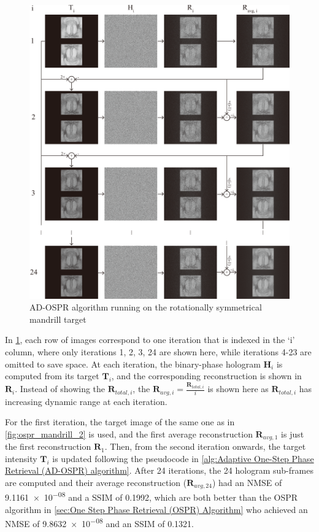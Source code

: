 \begin{figure}[H]
	\centering
	\includegraphics[width=1.0\textwidth]{adospr_mandrill_2.pdf}
	\caption{AD-OSPR algorithm running on the rotationally symmetrical mandrill target}
	\label{fig:adospr_mandrill_2}
\end{figure}

In \cref{fig:adospr_mandrill_2}, each row of images correspond to one iteration that is indexed in the `i' column, where only iterations 1, 2, 3, 24 are shown here, while iterations 4-23 are omitted to save space. At each iteration, the binary-phase hologram $\textbf{H}_i$ is computed from its target $\textbf{T}_i$, and the corresponding reconstruction is shown in $\textbf{R}_i$. Instead of showing the $\textbf{R}_{total, i}$, the $\textbf{R}_{avg, i}=\frac{\textbf{R}_{total, i}}{i}$ is shown here as $\textbf{R}_{total, i}$ has increasing dynamic range at each iteration.

For the first iteration, the target image of the same one as in \cref{fig:ospr_mandrill_2} is used, and the first average reconstruction $\textbf{R}_{avg, 1}$ is just the first reconstruction $\textbf{R}_1$. Then, from the second iteration onwards, the target intensity $\textbf{T}_i$ is updated following the pseudocode in \cref{alg:Adaptive One-Step Phase Retrieval (AD-OSPR) algorithm}. After 24 iterations, the 24 hologram sub-frames are computed and their average reconstruction ($\textbf{R}_{avg, 24}$) had an NMSE of \num{9.1161e-08} and a SSIM of 0.1992, which are both better than the OSPR algorithm in \cref{sec:One Step Phase Retrieval (OSPR) Algorithm} who achieved an NMSE of \num{9.8632e-08} and an SSIM of 0.1321.

